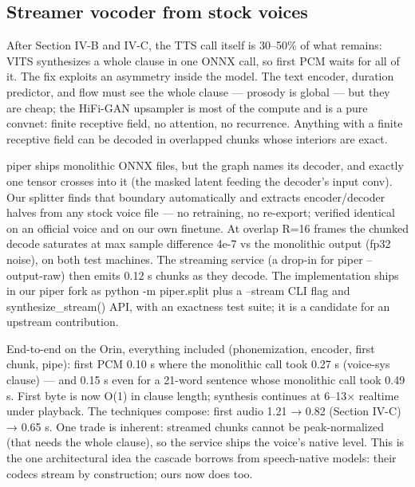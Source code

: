 \documentclass[journal]{IEEEtran}
\begin{document}
\subsection{Streamer vocoder from stock voices}

After Section IV-B and IV-C, the TTS call itself is 30–50\% of what remains: VITS synthesizes a whole clause in one ONNX call, so first PCM waits for all of it. The fix exploits an asymmetry inside the model. The text encoder, duration predictor, and flow must see the whole clause — prosody is global — but they are cheap; the HiFi-GAN upsampler is most of the compute and is a pure convnet: finite receptive field, no attention, no recurrence. Anything with a finite receptive field can be decoded in overlapped chunks whose interiors are exact.

piper ships monolithic ONNX files, but the graph names its decoder, and exactly one tensor crosses into it (the masked latent feeding the decoder's input conv). Our splitter finds that boundary automatically and extracts encoder/decoder halves from any stock voice file — no retraining, no re-export; verified identical on an official voice and on our own finetune. At overlap R=16 frames the chunked decode saturates at max sample difference 4e-7 vs the monolithic output (fp32 noise), on both test machines. The streaming service (a drop-in for piper --output-raw) then emits 0.12 s chunks as they decode. The implementation ships in our piper fork as python -m piper.split plus a --stream CLI flag and synthesize\_stream() API, with an exactness test suite; it is a candidate for an upstream contribution.

End-to-end on the Orin, everything included (phonemization, encoder, first chunk, pipe): first PCM 0.10 s where the monolithic call took 0.27 s (voice-sys clause) — and 0.15 s even for a 21-word sentence whose monolithic call took 0.49 s. First byte is now O(1) in clause length; synthesis continues at 6–13× realtime under playback. The techniques compose: first audio 1.21 → 0.82 (Section IV-C) → 0.65 s. One trade is inherent: streamed chunks cannot be peak-normalized (that needs the whole clause), so the service ships the voice's native level. This is the one architectural idea the cascade borrows from speech-native models: their codecs stream by construction; ours now does too.
\end{document}
